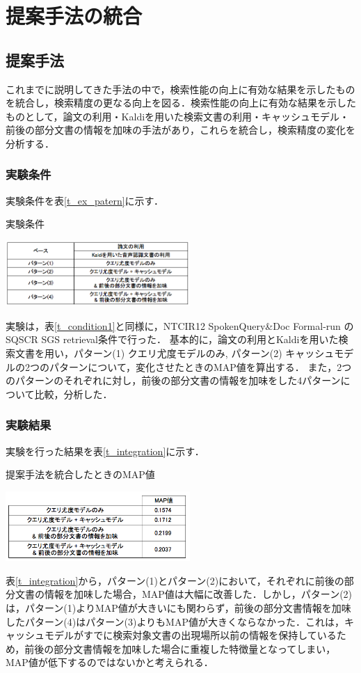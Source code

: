\chapter{提案手法の統合}

\section{提案手法}

これまでに説明してきた手法の中で，検索性能の向上に有効な結果を示したものを統合し，検索精度の更なる向上を図る．検索性能の向上に有効な結果を示したものとして，論文の利用・Kaldiを用いた検索文書の利用・キャッシュモデル・前後の部分文書の情報を加味の手法があり，これらを統合し，検索精度の変化を分析する．

\subsection{実験条件}
実験条件を表\ref{t_ex_patern}に示す．

\begin{table}[h]
    \centering
    \caption{実験条件}
    \includegraphics[width=7cm]{./image/t_ex_patern.png}
    \label{t_ex_patern}
\end{table}

実験は，表\ref{t_condition1}と同様に，NTCIR12 SpokenQuery\&Doc Formal-run の SQSCR SGS retrieval条件で行った．
基本的に，論文の利用とKaldiを用いた検索文書を用い，パターン(1) クエリ尤度モデルのみ, パターン(2) キャッシュモデルの2つのパターンについて，変化させたときのMAP値を算出する．
また，2つのパターンのそれぞれに対し，前後の部分文書の情報を加味をした4パターンについて比較，分析した．

\subsection{実験結果}
実験を行った結果を表\ref{t_integration}に示す．

\begin{table}[htbp]
    \centering
    \caption{提案手法を統合したときのMAP値}
    \includegraphics[width=7cm]{./image/t_integration.png}
    \label{t_integration}
\end{table}

表\ref{t_integration}から，パターン(1)とパターン(2)において，それぞれに前後の部分文書の情報を加味した場合，MAP値は大幅に改善した．しかし，パターン(2)は，パターン(1)よりMAP値が大きいにも関わらず，前後の部分文書情報を加味したパターン(4)はパターン(3)よりもMAP値が大きくならなかった．これは，キャッシュモデルがすでに検索対象文書の出現場所以前の情報を保持しているため，前後の部分文書情報を加味した場合に重複した特徴量となってしまい，MAP値が低下するのではないかと考えられる．

